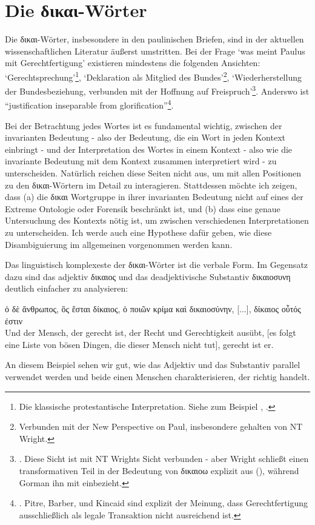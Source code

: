 \section{Die δικαι-Wörter}
Die δικαι-Wörter, insbesondere in den paulinischen Briefen, sind in der aktuellen wissenschaftlichen Literatur äußerst
umstritten. Bei der Frage `was meint Paulus mit Gerechtfertigung' existieren mindestens die folgenden Ansichten:
`Gerechtsprechung'\footnote{
	Die klassische protestantische Interpretation. Siehe zum Beispiel \Cite{both-judge-and-justifier}, \Cite[82ff]{nicnt-romans}.
}, `Deklaration als Mitglied des Bundes'\footnote{
	Verbunden mit der New Perspective on Paul, insbesondere gehalten von NT Wright.
}, `Wiederherstellung der Bundesbeziehung, verbunden mit der Hoffnung auf Freispruch'\footnote{
	\Cite{inhabiting-the-cruciform-god}. Diese Sicht ist mit NT Wrights Sicht verbunden - aber Wright schließt einen transformativen
	Teil in der Bedeutung von δικαιοω explizit aus (\Cite{paul-and-the-faithfulness-of-god}), während Gorman ihn mit einbezieht.
}.
Anderswo ist ``justification inseparable from glorification''\footnote{
	\Cite[197]{paul-a-new-covenant-jew}. Pitre, Barber, und Kincaid sind explizit der Meinung, dass Gerechtfertigung ausschließlich als legale
	Transaktion nicht ausreichend ist.
}.

Bei der Betrachtung jedes Wortes ist es fundamental wichtig, zwischen der invarianten Bedeutung - also der Bedeutung, die ein Wort in jeden Kontext einbringt - und
der Interpretation des Wortes in einem Kontext - also wie die invariante Bedeutung mit dem Kontext zusammen interpretiert wird - zu unterscheiden.
Natürlich reichen diese Seiten nicht aus, um mit allen Positionen zu den δικαι-Wörtern im Detail zu interagieren.
Stattdessen möchte ich zeigen, dass
(a) die δικαι Wortgruppe in ihrer invarianten Bedeutung nicht auf eines der Extreme Ontologie oder Forensik beschränkt ist, und
(b) dass eine genaue Untersuchung des Kontexts nötig ist, um zwischen verschiedenen Interpretationen zu unterscheiden.
Ich werde auch eine Hypothese dafür geben, wie diese Disambiguierung im allgemeinen vorgenommen werden kann.

Das linguistisch komplexeste der δικαι-Wörter ist die verbale Form. Im Gegensatz dazu sind das adjektiv δικαιος und das deadjektivische Substantiv δικαιοσυνη deutlich einfacher zu analysieren:
\begin{exe}
	\ex \label{ex:dikaios-open}
	{
		ὁ δὲ ἄνθρωπος, ὃς ἔσται δίκαιος, ὁ ποιῶν κρίμα καὶ δικαιοσύνην, [...], δίκαιος οὗτός ἐστιν \\
		Und der Mensch, der gerecht ist, der Recht und Gerechtigkeit ausübt, [es folgt eine Liste von bösen Dingen, die dieser Mensch nicht tut], gerecht ist er.
	}
\end{exe}
An diesem Beispiel sehen wir gut, wie das Adjektiv und das Substantiv parallel verwendet werden und beide einen Menschen charakterisieren, der richtig handelt.


